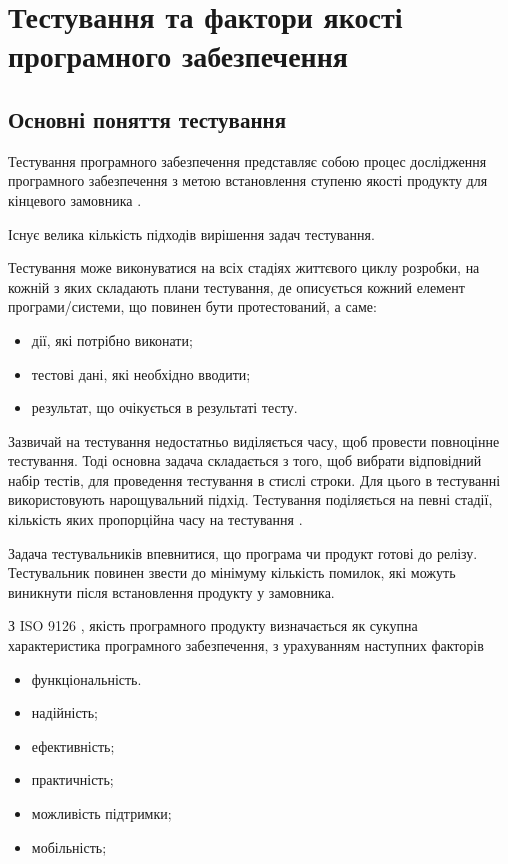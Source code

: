 \section[ТЕСТУВАННЯ ТА ФАКТОРИ ЯКОСТІ ПРОГРАМНОГО ЗАБЕЗПЕЧЕННЯ]{Тестування та фактори якості програмного забезпечення}

\subsection{Основні поняття тестування}
Тестування програмного забезпечення представляє собою процес
дослідження програмного забезпечення з метою встановлення
ступеню якості продукту для кінцевого замовника 
\cite{os-development,scrum-book,testing-black}.

Існує велика кількість підходів вирішення задач тестування.

Тестування може виконуватися на всіх стадіях життєвого циклу розробки,
на кожній з яких складають плани тестування, де описується кожний
елемент програми/системи, що повинен бути протестований, а саме:

\begin{itemize}
    \item дії, які потрібно виконати;
    \item тестові дані, які необхідно вводити;
    \item результат, що очікується в результаті тесту.
\end{itemize}

Зазвичай на тестування недостатньо виділяється часу,
щоб провести повноцінне тестування. Тоді основна задача складається
з того, щоб вибрати відповідний набір тестів, для проведення тестування в
стислі строки. Для цього в тестуванні використовують
нарощувальний підхід. Тестування поділяється на певні стадії,
кількість яких пропорційна часу на тестування 
\cite{testing-black,test-automation-article}.

Задача тестувальників впевнитися, що програма чи продукт готові до релізу.
Тестувальник повинен звести до мінімуму кількість помилок,
які можуть виникнути після встановлення продукту у замовника.

З ISO 9126 \cite{iso-software-eng}, якість програмного продукту визначається як сукупна
характеристика програмного забезпечення, з урахуванням наступних факторів

\begin{itemize}
    \item функціональність.
    \item надійність;
    \item ефективність;
    \item практичність;
    \item можливість підтримки;
    \item мобільність;
\end{itemize}

